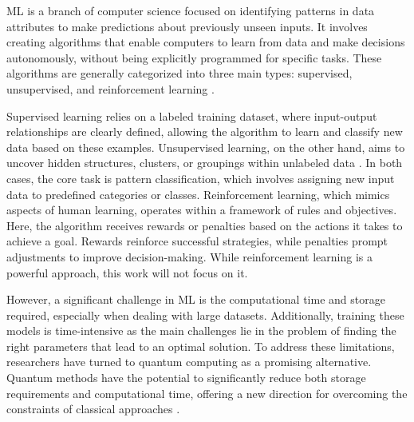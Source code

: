 \documentclass{article}
\begin{document}
ML is a branch of computer science focused on identifying patterns in data attributes to make predictions about previously unseen inputs. 
It involves creating algorithms that enable computers to learn from data and make decisions autonomously, without being explicitly programmed for specific tasks. 
These algorithms are generally categorized into three main types: supervised, unsupervised, and reinforcement learning \cite{Ayodele10}.

Supervised learning relies on a labeled training dataset, where input-output relationships are clearly defined, allowing the algorithm to learn and classify new data based on these examples. 
Unsupervised learning, on the other hand, aims to uncover hidden structures, clusters, or groupings within unlabeled data \cite{10047618}. 
In both cases, the core task is pattern classification, which involves assigning new input data to predefined categories or classes. Reinforcement learning, which mimics aspects of human learning, 
operates within a framework of rules and objectives. Here, the algorithm receives rewards or penalties based on the actions it takes to achieve a goal. Rewards reinforce successful strategies, 
while penalties prompt adjustments to improve decision-making. While reinforcement learning is a powerful approach, this work will not focus on it.

However, a significant challenge in ML is the computational time and storage required, especially when dealing with large datasets. 
Additionally, training these models is time-intensive as the main challenges lie in the problem of finding the right parameters that lead to an optimal solution. 
To address these limitations, researchers have turned to quantum computing as a promising alternative. 
Quantum methods have the potential to significantly reduce both storage requirements and computational time, offering a new direction for overcoming the 
constraints of classical approaches \cite{degruyterIntroductionQuantum}.
\end{document}
